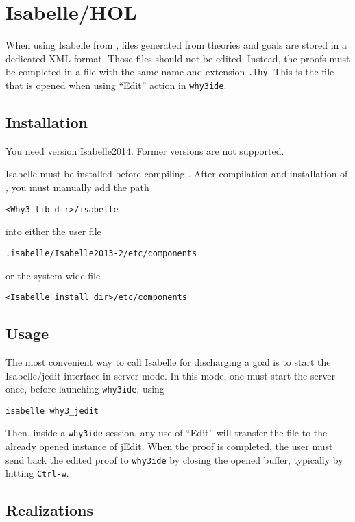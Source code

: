 \section{Isabelle/HOL}
\label{sec:isabelle}


When using Isabelle from \why, files generated from \why theories and
goals are stored in a dedicated XML format. Those files should not be
edited. Instead, the proofs must be completed in a file with the same
name and extension \texttt{.thy}. This is the file that is opened when
using ``Edit'' action in \texttt{why3ide}.

\subsection{Installation}

You need version Isabelle2014. Former versions are not supported.

Isabelle must be installed before compiling \why. After compilation
and installation of \why, you must manually add the path
\begin{verbatim}
<Why3 lib dir>/isabelle
\end{verbatim}
into either the user file
\begin{verbatim}
.isabelle/Isabelle2013-2/etc/components
\end{verbatim}
or the system-wide file
\begin{verbatim}
<Isabelle install dir>/etc/components
\end{verbatim}

\subsection{Usage}

The most convenient way to call Isabelle for discharging a \why goal
is to start the Isabelle/jedit interface in server mode. In this mode,
one must start the server once, before launching \texttt{why3ide},
using
\begin{verbatim}
isabelle why3_jedit
\end{verbatim}
Then, inside a \texttt{why3ide} session, any use of ``Edit'' will
transfer the file to the already opened instance of jEdit. When the
proof is completed, the user must send back the edited proof to
\texttt{why3ide} by closing the opened buffer, typically by hitting
\texttt{Ctrl-w}.

\subsection{Realizations}

